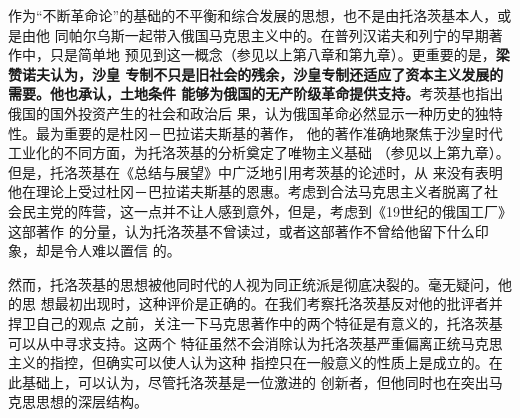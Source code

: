 作为“不断革命论”的基础的不平衡和综合发展的思想，也不是由托洛茨基本人，或是由他
同帕尔乌斯一起带入俄国马克思主义中的。在普列汉诺夫和列宁的早期著作中，只是简单地
预见到这一概念（参见以上第八章和第九章）。更重要的是，\textbf{梁赞诺夫认为，沙皇
  专制不只是旧社会的残余，沙皇专制还适应了资本主义发展的需要。他也承认，土地条件
  能够为俄国的无产阶级革命提供支持。}考茨基也指出俄国的国外投资产生的社会和政治后
果，认为俄国革命必然显示一种历史的独特性。最为重要的是杜冈－巴拉诺夫斯基的著作，
他的著作准确地聚焦于沙皇时代工业化的不同方面，为托洛茨基的分析奠定了唯物主义基础
（参见以上第九章）。但是，托洛茨基在《总结与展望》中广泛地引用考茨基的论述时，从
来没有表明他在理论上受过杜冈－巴拉诺夫斯基的恩惠。考虑到合法马克思主义者脱离了社
会民主党的阵营，这一点并不让人感到意外，但是，考虑到《19世纪的俄国工厂》这部著作
的分量，认为托洛茨基不曾读过，或者这部著作不曾给他留下什么印象，却是令人难以置信
的。

然而，托洛茨基的思想被他同时代的人视为同正统派是彻底决裂的。毫无疑问，他的思
想最初出现时，这种评价是正确的。在我们考察托洛茨基反对他的批评者并捍卫自己的观点
之前，关注一下马克思著作中的两个特征是有意义的，托洛茨基可以从中寻求支持。这两个
特征虽然不会消除认为托洛茨基严重偏离正统马克思主义的指控，但确实可以使人认为这种
指控只在一般意义的性质上是成立的。在此基础上，可以认为，尽管托洛茨基是一位激进的
创新者，但他同时也在突出马克思思想的深层结构。

